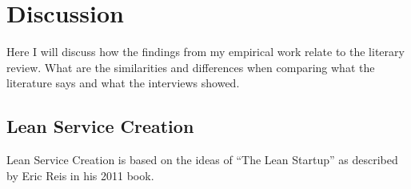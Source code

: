
\chapter{Discussion}
\label{chapter:discussion}

Here I will discuss how the findings from my empirical work relate to the literary review. What are the similarities and differences when comparing what the literature says and what the interviews showed.

\section{Lean Service Creation}
\label{section:lsc}


Lean Service Creation is based on the ideas of ``The Lean Startup'' as described by Eric Reis in his 2011 book.\cite{ries2011lean}

